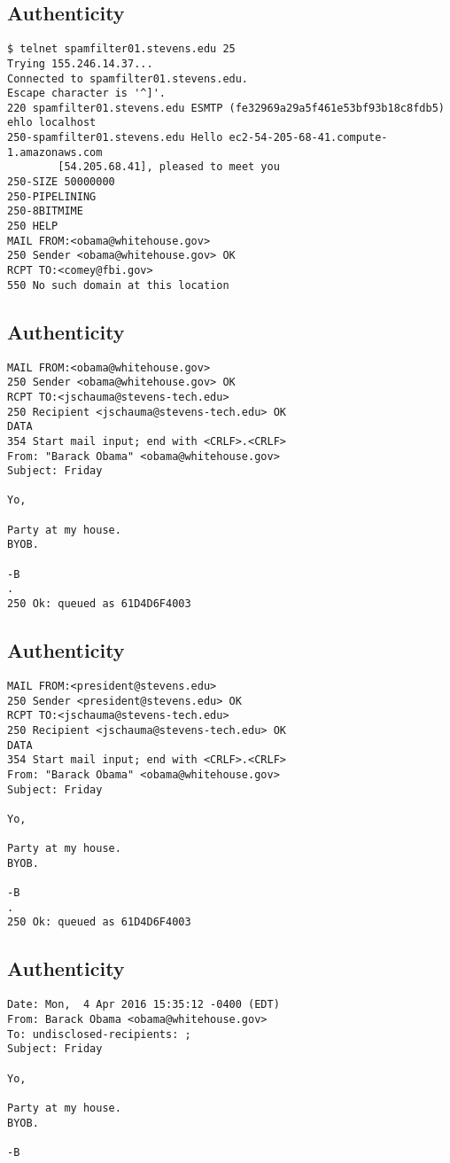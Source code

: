 \documentclass[xga]{xdvislides}
\begin{document}
\subsection{Authenticity}
\begin{verbatim}
$ telnet spamfilter01.stevens.edu 25
Trying 155.246.14.37...
Connected to spamfilter01.stevens.edu.
Escape character is '^]'.
220 spamfilter01.stevens.edu ESMTP (fe32969a29a5f461e53bf93b18c8fdb5)
ehlo localhost
250-spamfilter01.stevens.edu Hello ec2-54-205-68-41.compute-1.amazonaws.com
        [54.205.68.41], pleased to meet you
250-SIZE 50000000
250-PIPELINING
250-8BITMIME
250 HELP
MAIL FROM:<obama@whitehouse.gov>
250 Sender <obama@whitehouse.gov> OK
RCPT TO:<comey@fbi.gov>
550 No such domain at this location
\end{verbatim}

\subsection{Authenticity}
\begin{verbatim}
MAIL FROM:<obama@whitehouse.gov>
250 Sender <obama@whitehouse.gov> OK
RCPT TO:<jschauma@stevens-tech.edu>
250 Recipient <jschauma@stevens-tech.edu> OK
DATA
354 Start mail input; end with <CRLF>.<CRLF>
From: "Barack Obama" <obama@whitehouse.gov>
Subject: Friday

Yo,

Party at my house.
BYOB.

-B
.
250 Ok: queued as 61D4D6F4003
\end{verbatim}

\subsection{Authenticity}
\begin{verbatim}
MAIL FROM:<president@stevens.edu>
250 Sender <president@stevens.edu> OK
RCPT TO:<jschauma@stevens-tech.edu>
250 Recipient <jschauma@stevens-tech.edu> OK
DATA
354 Start mail input; end with <CRLF>.<CRLF>
From: "Barack Obama" <obama@whitehouse.gov>
Subject: Friday

Yo,

Party at my house.
BYOB.

-B
.
250 Ok: queued as 61D4D6F4003
\end{verbatim}

\subsection{Authenticity}
\begin{verbatim}
Date: Mon,  4 Apr 2016 15:35:12 -0400 (EDT)
From: Barack Obama <obama@whitehouse.gov>
To: undisclosed-recipients: ;
Subject: Friday

Yo,

Party at my house.
BYOB.

-B
\end{verbatim}
\end{document}
